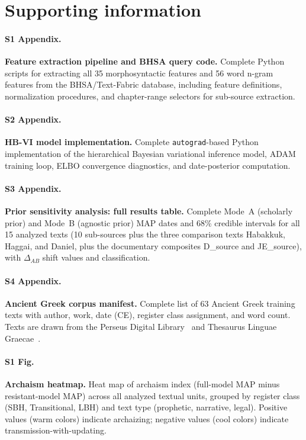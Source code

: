 \documentclass[10pt,letterpaper]{article}
\begin{document}
\section*{Supporting information}

\paragraph*{S1 Appendix.}
\label{S1_Appendix}
\textbf{Feature extraction pipeline and BHSA query code.}
Complete Python scripts for extracting all 35 morphosyntactic features and
56 word n-gram features from the BHSA/Text-Fabric database, including
feature definitions, normalization procedures, and chapter-range selectors
for sub-source extraction.

\paragraph*{S2 Appendix.}
\label{S2_Appendix}
\textbf{HB-VI model implementation.}
Complete \texttt{autograd}-based Python implementation of the hierarchical
Bayesian variational inference model, ADAM training loop, ELBO convergence
diagnostics, and date-posterior computation.

\paragraph*{S3 Appendix.}
\label{S3_Appendix}
\textbf{Prior sensitivity analysis: full results table.}
Complete Mode~A (scholarly prior) and Mode~B (agnostic prior) MAP dates and 68\% credible intervals
for all 15 analyzed texts (10 sub-sources plus the three comparison texts
Habakkuk, Haggai, and Daniel, plus the documentary composites D\_source
and JE\_source), with $\Delta_{AB}$ shift values and classification.

\paragraph*{S4 Appendix.}
\label{S4_Appendix}
\textbf{Ancient Greek corpus manifest.}
Complete list of 63 Ancient Greek training texts with author, work,
date (CE), register class assignment, and word count.  Texts are drawn
from the Perseus Digital Library~\cite{Perseus} and Thesaurus Linguae
Graecae~\cite{TLG}.

\paragraph*{S1 Fig.}
\label{S1_Fig}
\textbf{Archaism heatmap.}
Heat map of archaism index (full-model MAP minus resistant-model MAP)
across all analyzed textual units, grouped by register class (SBH,
Transitional, LBH) and text type (prophetic, narrative, legal).
Positive values (warm colors) indicate archaizing; negative values
(cool colors) indicate transmission-with-updating.
\end{document}
